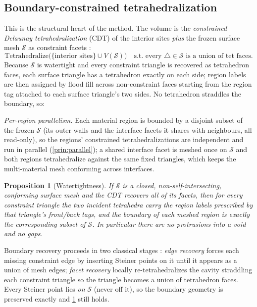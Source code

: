 \documentclass[11pt,a4paper]{article}
\numberwithin{equation}{section}
\newtheorem{proposition}{Proposition}[section]
\begin{document}
\subsection{Boundary-constrained tetrahedralization}
This is the structural heart of the method. The volume is the \emph{constrained
Delaunay tetrahedralization} (CDT) of the interior sites \emph{plus} the frozen
surface mesh $\mathcal{S}$ as constraint facets
\cite{Si2015,ShewchukCDT2002,ChengDeyShewchuk2012}:
\begin{equation}
\text{Tetrahedralize}\bigl(\{\text{interior sites}\}\cup V(\mathcal{S})\bigr)
\quad\text{s.t. every } \triangle\in\mathcal{S} \text{ is a union of tet faces.}
\end{equation}
Because $\mathcal{S}$ is watertight and every constraint triangle is recovered
as tetrahedron faces, each surface triangle has a tetrahedron exactly on each
side; region labels are then assigned by flood fill across non-constraint faces
starting from the region tag attached to each surface triangle's two sides.
No tetrahedron straddles the boundary, so:

\medskip
\noindent
\emph{Per-region parallelism.} Each material region is bounded by a disjoint
subset of the frozen $\mathcal{S}$ (its outer walls and the interface facets it
shares with neighbours, all read-only), so the regions' constrained
tetrahedralizations are independent and run in parallel
(\cref{prin:parallel}); a shared interface facet is meshed once on $\mathcal{S}$
and both regions tetrahedralize against the same fixed triangles, which keeps
the multi-material mesh conforming across interfaces.

\begin{proposition}[Watertightness]
\label{prop:watertight}
If $\mathcal{S}$ is a closed, non-self-intersecting, conforming surface mesh and
the CDT recovers all of its facets, then for every constraint triangle the two
incident tetrahedra carry the region labels prescribed by that triangle's
front/back tags, and the boundary of each meshed region is exactly the
corresponding subset of $\mathcal{S}$. In particular there are no protrusions
into a void and no gaps.
\end{proposition}

\noindent
Boundary recovery proceeds in two classical stages \cite{ShewchukCDT2002,Si2015}:
\emph{edge recovery} forces each missing constraint edge by inserting Steiner
points on it until it appears as a union of mesh edges; \emph{facet recovery}
locally re-tetrahedralizes the cavity straddling each constraint triangle so the
triangle becomes a union of tetrahedron faces. Every Steiner point lies
\emph{on} $\mathcal{S}$ (never off it), so the boundary geometry is preserved
exactly and \cref{prop:watertight} still holds.
\end{document}
